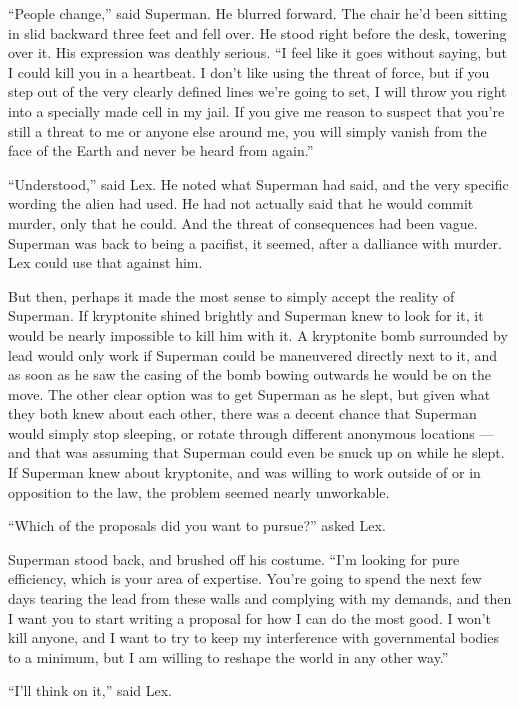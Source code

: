 ``People change,'' said Superman. He blurred forward. The chair he'd
been sitting in slid backward three feet and fell over. He stood right
before the desk, towering over it. His expression was deathly serious.
``I feel like it goes without saying, but I could kill you in a
heartbeat. I don't like using the threat of force, but if you step out
of the very clearly defined lines we're going to set, I will throw you
right into a specially made cell in my jail. If you give me reason to
suspect that you're still a threat to me or anyone else around me, you
will simply vanish from the face of the Earth and never be heard from
again.''

``Understood,'' said Lex. He noted what Superman had said, and the very
specific wording the alien had used. He had not actually said that he
would commit murder, only that he could. And the threat of consequences
had been vague. Superman was back to being a pacifist, it seemed, after
a dalliance with murder. Lex could use that against him.

But then, perhaps it made the most sense to simply accept the reality of
Superman. If kryptonite shined brightly and Superman knew to look for
it, it would be nearly impossible to kill him with it. A kryptonite bomb
surrounded by lead would only work if Superman could be maneuvered
directly next to it, and as soon as he saw the casing of the bomb bowing
outwards he would be on the move. The other clear option was to get
Superman as he slept, but given what they both knew about each other,
there was a decent chance that Superman would simply stop sleeping, or
rotate through different anonymous locations --- and that was assuming
that Superman could even be snuck up on while he slept. If Superman knew
about kryptonite, and was willing to work outside of or in opposition to
the law, the problem seemed nearly unworkable.

``Which of the proposals did you want to pursue?'' asked Lex.

Superman stood back, and brushed off his costume. ``I'm looking for pure
efficiency, which is your area of expertise. You're going to spend the
next few days tearing the lead from these walls and complying with my
demands, and then I want you to start writing a proposal for how I can
do the most good. I won't kill anyone, and I want to try to keep my
interference with governmental bodies to a minimum, but I am willing to
reshape the world in any other way.''

``I'll think on it,'' said Lex.

